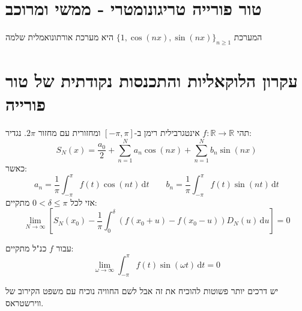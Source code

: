\documentclass{tstextbook}
\begin{document}
\section{טור פורייה טריגונומטרי - ממשי ומרוכב}

\begin{proposition}
המערכת \(\{1,\cos(n x),\sin(n x)\}_{n\geq1}\) היא מערכת אורתונואמלית שלמה

\end{proposition}
\section{עקרון הלוקאליות והתכנסות נקודתית של טור פורייה}

\begin{proposition}
תהי \(f:\mathbb{R}\to \mathbb{R}\) אינטגרבילית רימן ב-\([-\pi,\pi]\) ומחזורית עם מחזור \(2\pi\). נגדיר:
$$S_{N}(x)=\frac{a_{0}}{2}+\sum_{n=1}^{N} a_{n}\cos(nx)+\sum_{n=1}^{N} b_{n}\sin(nx)$$
כאשר:
$$a_{n}=\frac{1}{\pi}\int_{-\pi}^{\pi} f(t)\cos(nt) \, \mathrm{d}t\qquad b_{n}=\frac{1}{\pi}\int_{-\pi}^{\pi} f(t)\sin(nt) \, \mathrm{d}t  $$
אזי לכל \(0<\delta \leq \pi\) מתקיים:
$$\lim_{ N \to \infty } \left[ S_{N}(x_{0})-\frac{1}{\pi}\int_{0}^{\delta} (f(x_{0}+u)-f(x_{0}-u))D_{N}(u) \, \mathrm{d}u  \right]=0$$

\end{proposition}
\begin{lemma}
עבור \(f\) כנ"ל מתקיים:
$$\lim_{ \omega \to \infty } \int_{-\pi}^{\pi} f(t)\sin(\omega t) \, \mathrm{d}t=0 $$

\end{lemma}
יש דרכים יותר פשוטות להוכיח את זה אבל לשם החוויה נוכיח עם משפט הקירוב של ווירשטראס.
\end{document}
